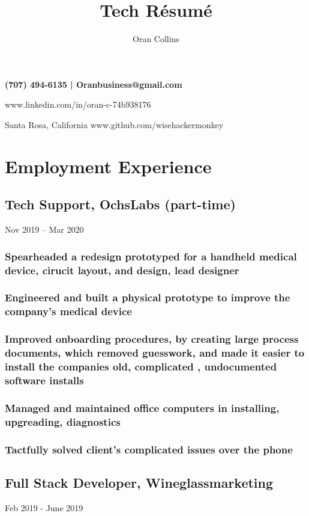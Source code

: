 \documentclass{article}
\makeatletter
\renewcommand{\maketitle}{
\begin{flushleft}
\bfseries
{\Huge\theauthor}\hfill
(707) 494-6135 |  Oranbusiness@gmail.com

\hfill www.linkedin.com/in/oran-c-74b938176

{\hspace{1mm}Santa Rosa, California}\hfill 
www.github.com/wisehackermonkey

\end{flushleft}
}
\makeatother
\begin{document}
\title{Tech R\'esum\'e}
\author{Oran Collins}


\maketitle

\section{Employment Experience}
	 \subsection{Tech Support, OchsLabs (part-time)} Nov 2019 – Mar 2020
        
        \vspace{-2mm}
        \subsubsection{Spearheaded a redesign prototyped for a handheld medical device, cirucit layout, and design, lead designer}
    	\subsubsection{Engineered and built a physical prototype to improve the company's medical device}
		\subsubsection{Improved onboarding procedures, by creating large process documents, which removed guesswork, and made it easier to install the companies old, complicated , undocumented software installs}
    	\subsubsection{Managed and maintained office computers in installing, upgreading, diagnostics}

    	\subsubsection{Tactfully solved client's complicated issues over the phone}
    	

    \subsection{Full Stack Developer, Wineglassmarketing}Feb 2019 - June 2019
	        \vspace{-2mm}
\end{document}
